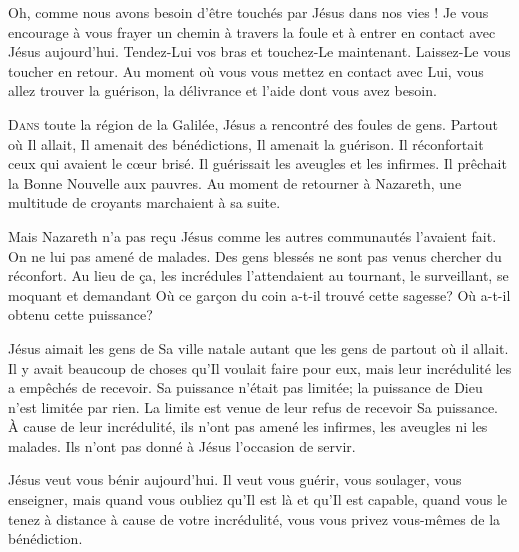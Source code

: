 Oh, comme nous avons besoin d'être touchés par Jésus dans nos vies !
 Je vous encourage à vous frayer un chemin à travers la foule
 et à entrer en contact avec Jésus aujourd'hui.
 Tendez-Lui  vos bras et touchez-Le 
 maintenant. Laissez-Le   vous toucher en retour.
 Au moment où vous vous mettez en contact avec Lui,
 vous allez trouver la guérison, la délivrance et l'aide dont vous avez besoin.

\dvrule






\lettrine{D}{ans} toute la région de la Galilée,
 Jésus a rencontré des foules de gens. Partout où Il allait,
 Il amenait des bénédictions, Il amenait la guérison.
 Il réconfortait ceux qui avaient le c\oe{}ur brisé.
 Il guérissait les aveugles et les infirmes.
 Il prêchait la Bonne Nouvelle aux pauvres.
 Au moment de retourner à Nazareth, une multitude de croyants
 marchaient à sa suite.

Mais Nazareth n'a pas re\c{c}u Jésus comme les autres communautés
 l'avaient fait. On ne lui pas amené de malades.
 Des gens blessés ne sont pas venus chercher du réconfort.
 Au lieu de \c{c}a, les incrédules l'attendaient au tournant,
 le surveillant, se moquant et demandant\frcolon{}
 \Og Où ce gar\c{c}on du coin a-t-il trouvé cette sagesse? \Fg{}
 \Og Où a-t-il obtenu cette puissance? \Fg{}


Jésus aimait les gens de Sa ville natale autant que les gens
 de partout où il allait. Il y avait beaucoup de choses
 qu'Il voulait faire pour eux, mais leur incrédulité
 les a empêchés de recevoir. Sa puissance n'était pas limitée;
 la puissance de Dieu n'est limitée par rien.
 La limite est venue de leur refus de recevoir Sa puissance.
 À cause de leur incrédulité, ils n'ont pas amené les infirmes,
 les aveugles ni les malades. Ils n'ont pas donné à Jésus l'occasion de servir.

Jésus veut vous bénir aujourd'hui. Il veut vous guérir, vous soulager,
 vous enseigner, mais quand vous oubliez qu'Il est là et qu'Il est capable,
 quand vous le tenez à distance à cause de votre incrédulité,
 vous vous privez vous-mêmes de la bénédiction.

